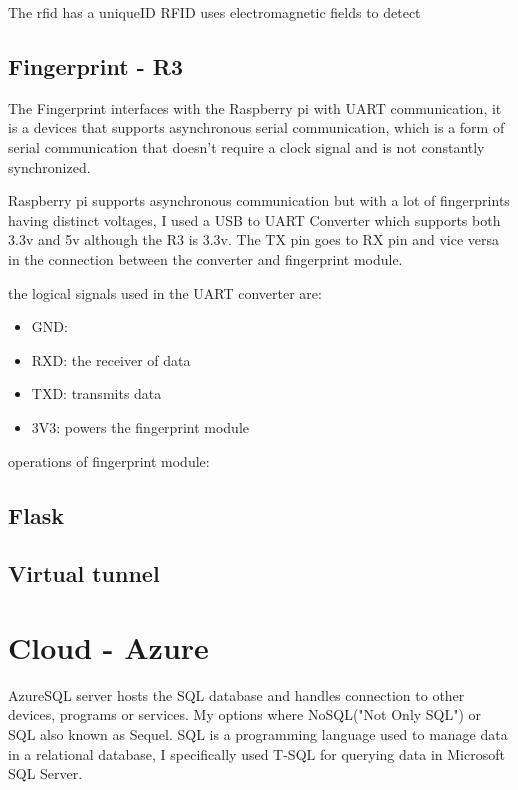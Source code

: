 The rfid has a uniqueID
RFID uses electromagnetic fields to detect 




\subsection{Fingerprint - R3}
The Fingerprint interfaces with the Raspberry pi with UART communication, it is a devices that supports asynchronous serial communication, which is a form of serial communication that doesn't require a clock signal and is not constantly synchronized. 

Raspberry pi supports asynchronous communication but with a lot of fingerprints having distinct voltages, I used a USB to UART Converter which supports both 3.3v and 5v although the R3 is 3.3v. The TX pin goes to RX pin and vice versa in the connection between the converter and fingerprint module.

the logical signals used in the UART converter are:
\begin{itemize}
  \item GND:
  \item RXD: the receiver of data
  \item TXD: transmits data
  \item 3V3: powers the fingerprint module
\end{itemize}

operations of fingerprint module:



\subsection{Flask}


\subsection{Virtual tunnel}



\section{Cloud - Azure}
AzureSQL server hosts the SQL database and handles connection to other devices, programs or services. 
My options where NoSQL("Not Only SQL") or SQL also known as Sequel.
SQL is a programming language used to manage data in a relational database, I specifically used T-SQL for querying data in Microsoft SQL Server. 




